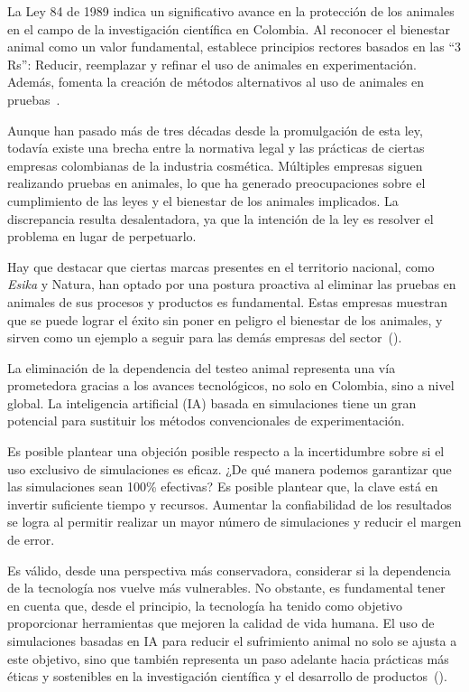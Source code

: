 \documentclass[letterpaper, 12pt]{report}
\begin{document}
La Ley 84 de 1989 indica un significativo avance en la protección de
los animales en el campo de la investigación científica en Colombia.
Al reconocer el bienestar animal como un valor fundamental, establece
principios rectores basados en las ``3 Rs'': Reducir, reemplazar y refinar
el uso de animales en experimentación. Además, fomenta la creación de
métodos alternativos al uso de animales en pruebas~\textcite{Ley84de1989}.

Aunque han pasado más de tres décadas desde la promulgación de esta ley,
todavía existe una brecha entre la normativa legal y las prácticas de
ciertas empresas colombianas de la industria cosmética. Múltiples empresas
siguen realizando pruebas en animales, lo que ha generado preocupaciones
sobre el cumplimiento de las leyes y el bienestar de los animales implicados.
La discrepancia resulta desalentadora, ya que la intención de la ley es
resolver el problema en lugar de perpetuarlo.

Hay que destacar que ciertas marcas presentes en el territorio nacional, como
\textit{Esika} y Natura, han optado por una postura proactiva al eliminar las pruebas
en animales de sus procesos y productos es fundamental. Estas empresas
muestran que se puede lograr el éxito sin poner en peligro el bienestar de
los animales, y sirven como un ejemplo a seguir para las demás empresas del
sector~(\cite{FundacionAmigosdelPlaneta2023}).

La eliminación de la dependencia del testeo animal representa una vía
prometedora gracias a los avances tecnológicos, no solo en Colombia, sino
a nivel global. La inteligencia artificial (IA) basada en simulaciones tiene
un gran potencial para sustituir los métodos convencionales de experimentación.

Es posible plantear una objeción posible respecto a la incertidumbre sobre
si el uso exclusivo de simulaciones es eficaz. ¿De qué manera podemos
garantizar que las simulaciones sean 100\% efectivas? Es posible plantear
que, la clave está en invertir suficiente tiempo y recursos. Aumentar la
confiabilidad de los resultados se logra al permitir realizar un mayor
número de simulaciones y reducir el margen de error.

Es válido, desde una perspectiva más conservadora, considerar si la
dependencia de la tecnología nos vuelve más vulnerables. No obstante, es
fundamental tener en cuenta que, desde el principio, la tecnología ha tenido
como objetivo proporcionar herramientas que mejoren la calidad de vida
humana. El uso de simulaciones basadas en IA para reducir el sufrimiento
animal no solo se ajusta a este objetivo, sino que también representa un
paso adelante hacia prácticas más éticas y sostenibles en la investigación
científica y el desarrollo de productos~(\cite{HerrmannJayne2019}).
\end{document}
